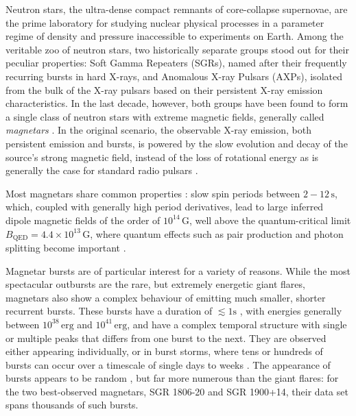 \documentclass[12pt]{emulateapj}
\begin{document}
Neutron stars, the ultra-dense compact remnants of core-collapse supernovae, are the prime laboratory for studying nuclear 
physical processes in a parameter regime of density and pressure inaccessible to experiments on Earth. 
Among the veritable zoo of neutron stars, two historically separate groups stood out for their peculiar properties: Soft Gamma Repeaters (SGRs), named after their frequently recurring bursts in hard X-rays, and Anomalous X-ray Pulsars (AXPs), isolated from the bulk of the X-ray pulsars based on their persistent X-ray
emission characteristics. In the last decade, however, both groups have been found to form a single class of neutron stars with extreme magnetic fields, generally called {\it magnetars} \citep{duncan1992,thompson1995}. In the original scenario, the observable X-ray emission, both persistent emission and bursts, 
is powered by the slow evolution and decay of the source's strong magnetic field, instead of the loss of rotational energy as is generally the case for standard radio pulsars \citep{thompson1995,thompson2001}. 

Most magnetars share common properties \citep[for general overviews, see ][]{woods2006,mereghetti2011}: slow spin periods between
$2 - 12 \, \mathrm{s}$, which, coupled with generally high period derivatives, lead to large inferred dipole magnetic fields of
the order of $10^{14} \, \mathrm{G}$, well above the quantum-critical limit $B_{\mathrm{QED}} = 4.4 \times 10^{13} \, \mathrm{G}$,
where quantum effects such as pair production and photon splitting become important \citep[although three sources have been 
identified with properties similar to magnetars, but inferred dipole fields below this limit;][]{vanderhorst2010,esposito2010,rea2010,rea2012,scholz2012,rea2014}. 

Magnetar bursts are of particular interest for a variety of reasons. While the most spectacular outbursts are the rare, but extremely energetic giant flares,
magnetars also show a complex behaviour of emitting much smaller, shorter recurrent bursts. These bursts have a duration of $\lesssim 1\mathrm{s}$ , with energies
generally between $10^{38}\,\mathrm{erg}$ and $10^{41}\,\mathrm{erg}$, and have a complex temporal structure with single or
multiple peaks that differs from one burst to the next. They are observed either appearing individually, or in burst 
storms, where tens or hundreds of bursts can occur over a timescale of single days to weeks \citep{mazets1999,goetz2006b,israel2008,mereghetti2009,savchenko2010,israel2010,scholz2011,dib2012,vanderhorst2012,vonkienlin2012}. 
The appearance of bursts appears to be random \citep{gogus1999,gogus2000}, but far more numerous than the giant flares: 
for the two best-observed magnetars, SGR 1806-20 and SGR 1900+14, their
data set spans thousands of such bursts. 
\end{document}

